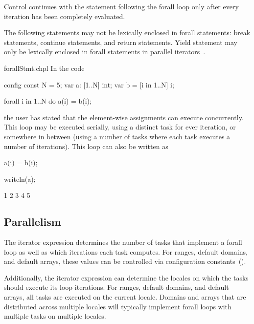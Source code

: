 Control continues with the statement following the forall loop only
after every iteration has been completely evaluated.

The following statements may not be lexically enclosed in forall
statements: break statements, continue statements, and return
statements.  Yield statement may only be lexically enclosed in forall
statements in parallel iterators~.

\begin{chapelexample}{forallStmt.chpl}
In the code
\begin{chapelpre}
config const N = 5;
var a: [1..N] int;
var b = [i in 1..N] i;
\end{chapelpre}
\begin{chapel}
forall i in 1..N do
  a(i) = b(i);
\end{chapel}
the user has stated that the element-wise assignments can execute
concurrently.  This loop may be executed serially, using a distinct
task for ever iteration, or somewhere in between (using a number of
tasks where each task executes a number of iterations).  This loop can
also be written as
\begin{chapel}
[i in 1..N] a(i) = b(i);
\end{chapel}
\begin{chapelpost}
writeln(a);
\end{chapelpost}
\begin{chapeloutput}
1 2 3 4 5
\end{chapeloutput}
\end{chapelexample}

\subsection{Parallelism}
\label{forall_parallelism}

The iterator expression determines the number of tasks that implement
a forall loop as well as which iterations each task computes.  For
ranges, default domains, and default arrays, these values can be
controlled via configuration constants~().

Additionally, the iterator expression can determine the locales on
which the tasks should execute its loop iterations.  For ranges,
default domains, and default arrays, all tasks are executed on the
current locale.  Domains and arrays that are distributed across
multiple locales will typically implement forall loops with multiple
tasks on multiple locales.

